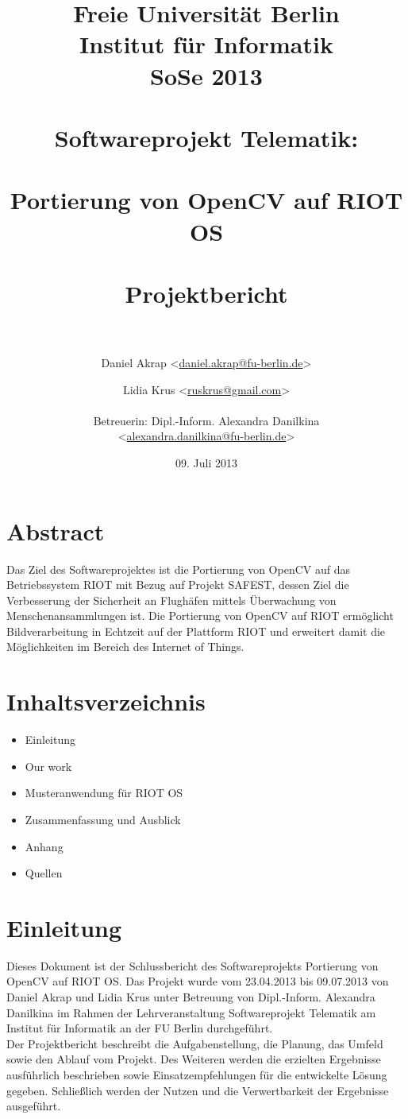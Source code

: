 \documentclass[10pt,a4paper]{article}
\title{Freie Universität Berlin \\
	Institut für Informatik \\
	SoSe 2013 \\ \ \\
	Softwareprojekt Telematik: \\ \ \\
	\textbf {Portierung von OpenCV auf RIOT OS} \\ \ \\
	Projektbericht \\ \ \\}
\author{Daniel Akrap  \textless\href{mailto:daniel.akrap@fu-berlin.de}{daniel.akrap@fu-berlin.de}\textgreater
        \and Lidia Krus \textless\href{mailto:ruskrus@gmail.com}{ruskrus@gmail.com}\textgreater 		\\ \\
	Betreuerin: Dipl.-Inform. Alexandra Danilkina \\ 
	\textless\href{mailto:alexandra.danilkina@fu-berlin.de}{alexandra.danilkina@fu-berlin.de}\textgreater}
\date{09. Juli 2013}
\begin{document}
\maketitle

\newpage
\section*{Abstract}

Das Ziel des Softwareprojektes ist die Portierung von OpenCV auf das Betriebssystem RIOT mit Bezug auf Projekt SAFEST, dessen Ziel die Verbesserung der Sicherheit an Flughäfen mittels Überwachung von Menschenansammlungen ist. Die Portierung von OpenCV auf RIOT ermöglicht Bildverarbeitung in Echtzeit auf der Plattform RIOT und erweitert damit die Möglichkeiten im Bereich des Internet of Things. \\

\newpage
\section*{Inhaltsverzeichnis}

\begin{itemize}
\item Einleitung
\item Our work
\item Musteranwendung für RIOT OS
\item Zusammenfassung und Ausblick
\item Anhang
\item Quellen
\end{itemize}

\newpage
\section{Einleitung}

Dieses Dokument ist der Schlussbericht des Softwareprojekts \glqq Portierung von OpenCV auf RIOT OS\grqq. Das Projekt wurde vom 23.04.2013 bis 09.07.2013 von Daniel Akrap und Lidia Krus unter Betreuung von Dipl.-Inform. Alexandra Danilkina im Rahmen der Lehrveranstaltung Softwareprojekt Telematik am Institut für Informatik an der FU Berlin durchgeführt. \\

Der Projektbericht beschreibt die Aufgabenstellung, die Planung, das Umfeld sowie den Ablauf vom Projekt. Des Weiteren werden die erzielten Ergebnisse ausführlich beschrieben sowie Einsatzempfehlungen für die entwickelte Lösung gegeben. Schließlich werden der Nutzen und die Verwertbarkeit der Ergebnisse ausgeführt.
\end{document}
